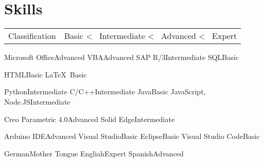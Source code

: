 \section{Skills}

\noindent
\begin{tabular*}{\textwidth}{@{}Z{\BrErsteSpSkills}|c@{\extracolsep{\fill}}}
\noindent
{\small Classification}	&	{\small Basic \textless~ Intermediate \textless~ Advanced \textless~ Expert}

\end{tabular*}
\newline
\vspace{0.5cm}


%
	{Microsoft Office}{Advanced}
	{VBA}{Advanced}
	{SAP R/3}{Intermediate}
	{SQL}{Basic}
\newline

%
	{HTML}{Basic}
	{\LaTeX\ }{Basic}
	{}{}
	{}{}
\newline

%
	{Python}{Intermediate}	
	{C/C++}{Intermediate}
	{Java}{Basic}
	{JavaScript, Node.JS}{Intermediate}
\newline

	{Creo Parametric 4.0}{Advanced}
	{Solid Edge}{Intermediate}
	{}{}
	{}{}
\newline

	{Arduino IDE}{Advanced}	
	{Visual Studio}{Basic}
	{Eclipse}{Basic}
	{Visual Studio Code}{Basic}
\newline

	{German}{Mother Tongue}
	{Engliah}{Expert}
	{Spanish}{Advanced}
	{}{}